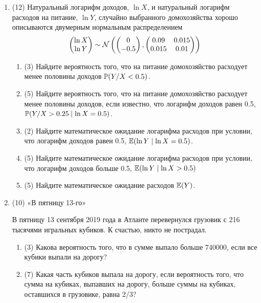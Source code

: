 \begin{enumerate}
\item (12) Натуральный логарифм доходов, $\ln X$, и натуральный логарифм расходов на питание, $\ln Y$, 
случайно выбранного домохозяйства хорошо описываются двумерным нормальным распределением 
\[
\begin{pmatrix}
  \ln X \\
  \ln Y
\end{pmatrix} \sim 
\cN\left(
  \begin{pmatrix}
    0\\
    -0.5\\
  \end{pmatrix}, 
  \begin{pmatrix}
    0.09 & 0.015\\
    0.015 & 0.01 \\
  \end{pmatrix}
  \right)
\]
\begin{enumerate}
\item  (3) Найдите вероятность того, что на питание домохозяйство расходует менее половины доходов
$\P(Y / X < 0.5)$.
\item  (5) Найдите вероятность того, что на питание домохозяйство расходует менее половины доходов, если известно, что логарифм доходов равен 0.5,
$\P(Y / X > 0.25 \mid \ln X  = 0.5)$.
\item  (2) Найдите математическое ожидание логарифма расходов при условии, что логарифм доходов равен 0.5,
$\E(\ln Y \mid \ln X =0.5)$.
\item  (5) Найдите математическое ожидание логарифма расходов при условии, что логарифм доходов больше 0.5,
$\E(\ln Y \mid \ln X >0.5)$
\item  (5) Найдите математическое ожидание расходов $\E(Y)$.
\end{enumerate}

\item (10) «В пятницу 13-го»

В пятницу 13 сентября 2019 года в Атланте перевернулся грузовик с 216 тысячями игральных кубиков. 
К счастью, никто не пострадал.
\begin{enumerate}
\item (3) Какова вероятность того, что в сумме выпало больше 740000, если все кубики выпали на дорогу?
\item (7) Какая часть кубиков выпала на дорогу, если вероятность того, что сумма на кубиках, выпавших на дорогу, 
больше суммы на кубиках, оставшихся в грузовике, равна 2/3?
\end{enumerate}



\end{enumerate}
